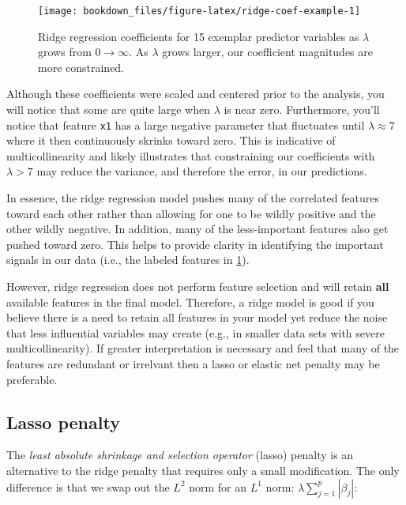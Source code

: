 \documentclass[]{krantz}
\begin{document}
\begin{figure}

{\centering \texttt{[image: bookdown\_files/figure-latex/ridge-coef-example-1]} 

}

\caption{Ridge regression coefficients for 15 exemplar predictor variables as $\lambda$ grows from  $0 \rightarrow \infty$. As $\lambda$ grows larger, our coefficient magnitudes are more constrained.}\label{fig:ridge-coef-example}
\end{figure}

Although these coefficients were scaled and centered prior to the analysis, you will notice that some are quite large when \(\lambda\) is near zero. Furthermore, you'll notice that feature \texttt{x1} has a large negative parameter that fluctuates until \(\lambda \approx 7\) where it then continuously skrinks toward zero. This is indicative of multicollinearity and likely illustrates that constraining our coefficients with \(\lambda > 7\) may reduce the variance, and therefore the error, in our predictions.

In essence, the ridge regression model pushes many of the correlated features toward each other rather than allowing for one to be wildly positive and the other wildly negative. In addition, many of the less-important features also get pushed toward zero. This helps to provide clarity in identifying the important signals in our data (i.e., the labeled features in \ref{fig:ridge-coef-example}).

However, ridge regression does not perform feature selection and will retain \textbf{all} available features in the final model. Therefore, a ridge model is good if you believe there is a need to retain all features in your model yet reduce the noise that less influential variables may create (e.g., in smaller data sets with severe multicollinearity). If greater interpretation is necessary and feel that many of the features are redundant or irrelvant then a lasso or elastic net penalty may be preferable.

\hypertarget{lasso}{%
\subsection{Lasso penalty}\label{lasso}}

The \emph{least absolute shrinkage and selection operator} (lasso) penalty \citep{tibshirani1996regression} is an alternative to the ridge penalty that requires only a small modification. The only difference is that we swap out the \(L^2\) norm for an \(L^1\) norm: \(\lambda \sum^p_{j=1} | \beta_j|\):
\end{document}

